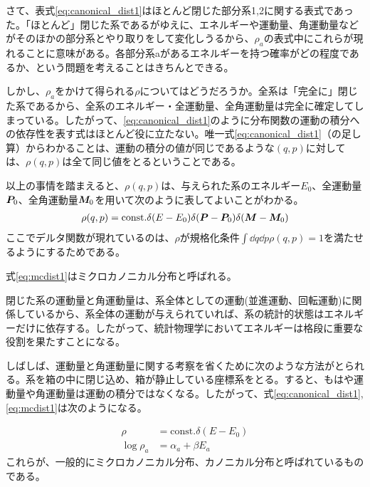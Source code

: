 \documentclass[uplatex,dvipdfmx]{jsarticle}
\begin{document}
        さて、表式\eqref{eq:canonical_dist1}はほとんど閉じた部分系1,2に関する表式であった。「ほとんど」閉じた系であるがゆえに、エネルギーや運動量、角運動量などがそのほかの部分系とやり取りをして変化しうるから、$\rho_a$の表式中にこれらが現れることに意味がある。各部分系aがあるエネルギーを持つ確率がどの程度であるか、という問題を考えることはきちんとできる。

        しかし、$\rho_a$をかけて得られる$\rho$についてはどうだろうか。全系は「完全に」閉じた系であるから、全系のエネルギー・全運動量、全角運動量は完全に確定してしまっている。したがって、\eqref{eq:canonical_dist1}のように分布関数の運動の積分への依存性を表す式はほとんど役に立たない。唯一式\eqref{eq:canonical_dist1}（の足し算）からわかることは、運動の積分の値が同じであるような$(q,p)$に対しては、$\rho(q,p)$は全て同じ値をとるということである。

        以上の事情を踏まえると、$\rho(q,p)$は、与えられた系のエネルギー$E_0$、全運動量$\vb*{P}_0$、全角運動量$\vb*{M}_0$を用いて次のように表してよいことがわかる。
        \begin{align}
            \rho(q,p) = \text{const.}\delta(E-E_0)\delta(\vb*{P}-\vb*{P}_0)\delta(\vb*{M}-\vb*{M}_0) \label{eq:mcdist1}
        \end{align}
        ここでデルタ関数が現れているのは、$\rho$が規格化条件$\int \dd{q}\dd{p} \rho(q,p) = 1$を満たせるようにするためである。

        式\eqref{eq:mcdist1}はミクロカノニカル分布と呼ばれる。

        閉じた系の運動量と角運動量は、系全体としての運動(並進運動、回転運動)に関係しているから、系全体の運動が与えられていれば、系の統計的状態はエネルギーだけに依存する。したがって、統計物理学においてエネルギーは格段に重要な役割を果たすことになる。

        しばしば、運動量と角運動量に関する考察を省くために次のような方法がとられる。系を箱の中に閉じ込め、箱が静止している座標系をとる。すると、もはや運動量や角運動量は運動の積分ではなくなる。したがって、式\eqref{eq:canonical_dist1},\eqref{eq:mcdist1}は次のようになる。

        \begin{align}
            \rho &= \text{const.}\delta(E-E_0) \\
            \log \rho_a &= \alpha_a + \beta E_a            
        \end{align}
        これらが、一般的にミクロカノニカル分布、カノニカル分布と呼ばれているものである。
\end{document}
